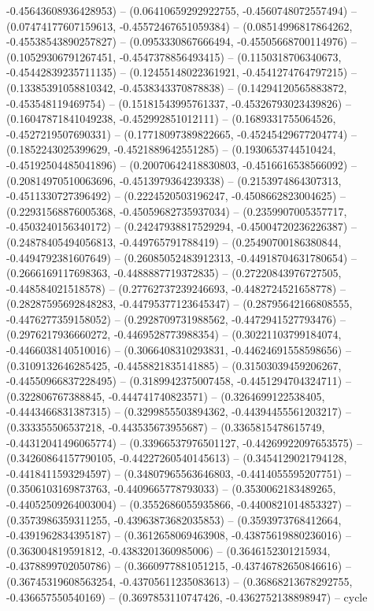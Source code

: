 -0.45643608936428953) -- (0.06410659292922755, -0.4560748072557494) -- (0.07474177607159613, -0.45572467651059384) -- (0.08514996817864262, -0.45538543890257827) -- (0.0953330867666494, -0.45505668700114976) -- (0.10529306791267451, -0.4547378856493415) -- (0.1150318706340673, -0.45442839235711135) -- (0.12455148022361921, -0.4541274764797215) -- (0.13385391058810342, -0.4538343370878838) -- (0.14294120565883872, -0.453548119469754) -- (0.15181543995761337, -0.45326793023439826) -- (0.16047871841049238, -0.452992851012111) -- (0.1689331755064526, -0.4527219507690331) -- (0.17718097389822665, -0.45245429677204774) -- (0.1852243025399629, -0.4521889642551285) -- (0.1930653744510424, -0.45192504485041896) -- (0.20070642418830803, -0.4516616538566092) -- (0.20814970510063696, -0.4513979364239338) -- (0.2153974864307313, -0.4511330727396492) -- (0.2224520503196247, -0.4508662823004625) -- (0.22931568876005368, -0.45059682735937034) -- (0.2359907005357717, -0.4503240156340172) -- (0.24247938817529294, -0.45004720236226387) -- (0.24878405494056813, -0.449765791788419) -- (0.25490700186380844, -0.4494792381607649) -- (0.26085052483912313, -0.44918704631780654) -- (0.2666169117698363, -0.4488887719372835) -- (0.27220843976727505, -0.448584021518578) -- (0.27762737239246693, -0.4482724521658778) -- (0.28287595692848283, -0.44795377123645347) -- (0.28795642166808555, -0.4476277359158052) -- (0.2928709731988562, -0.4472941527793476) -- (0.2976217936660272, -0.4469528773988354) -- (0.30221103799184074, -0.4466038140510016) -- (0.3066408310293831, -0.44624691558598656) -- (0.3109132646285425, -0.4458821835141885) -- (0.31503039459206267, -0.44550966837228495) -- (0.3189942375007458, -0.4451294704324711) -- (0.322806767388845, -0.444741740823571) -- (0.3264699122538405, -0.4443466831387315) -- (0.3299855503894362, -0.44394455561203217) -- (0.333355506537218, -0.443535673955687) -- (0.3365815478615749, -0.44312041496065774) -- (0.33966537976501127, -0.44269922097653575) -- (0.34260864157790105, -0.44227260540145613) -- (0.3454129021794128, -0.4418411593294597) -- (0.34807965563646803, -0.4414055595207751) -- (0.3506103169873763, -0.4409665778793033) -- (0.3530062183489265, -0.44052509264003004) -- (0.3552686055935866, -0.4400821014853327) -- (0.3573986359311255, -0.43963873682035853) -- (0.3593973768412664, -0.4391962834395187) -- (0.3612658069463908, -0.43875619880236016) -- (0.363004819591812, -0.4383201360985006) -- (0.3646152301215934, -0.4378899702050786) -- (0.3660977881051215, -0.43746782650846616) -- (0.36745319608563254, -0.43705611235083613) -- (0.36868213678292755, -0.436657550540169) -- (0.3697853110747426, -0.4362752138898947) -- cycle
